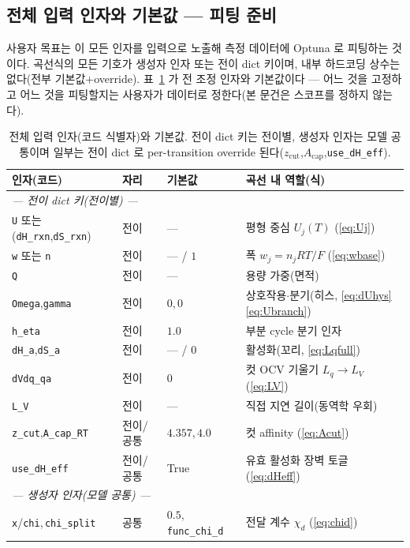 \documentclass[11pt,a4paper]{article}
\newcommand{\code}[1]{\texttt{#1}}
\begin{document}
\subsection{전체 입력 인자와 기본값 — 피팅 준비}
사용자 목표는 이 모든 인자를 입력으로 노출해 측정 데이터에 Optuna 로 피팅하는 것이다. 곡선식의 모든 기호가 생성자 인자
또는 전이 dict 키이며, 내부 하드코딩 상수는 없다(전부 기본값$+$override). 표~\ref{tab:inputs} 가 전 조정 인자와
기본값이다 — 어느 것을 고정하고 어느 것을 피팅할지는 사용자가 데이터로 정한다(본 문건은 스코프를 정하지 않는다).

\begin{table}[t]
\centering\footnotesize
\renewcommand{\arraystretch}{1.18}
\caption{전체 입력 인자(코드 식별자)와 기본값. 전이 dict 키는 전이별, 생성자 인자는 모델 공통이며 일부는 전이 dict 로
per-transition override 된다($z_\mathrm{cut}$,$A_\mathrm{cap}$,\code{use\_dH\_eff}).}
\label{tab:inputs}
\begin{tabular}{l l l l}
\toprule
인자(코드) & 자리 & 기본값 & 곡선 내 역할(식) \\
\midrule
\multicolumn{4}{l}{\emph{— 전이 dict 키(전이별) —}}\\
\code{U} 또는 (\code{dH\_rxn},\code{dS\_rxn}) & 전이 & --- & 평형 중심 $U_j(T)$ (\eqref{eq:Uj}) \\
\code{w} 또는 \code{n} & 전이 & --- / $1$ & 폭 $w_j=n_jRT/F$ (\eqref{eq:wbase}) \\
\code{Q} & 전이 & --- & 용량 가중(면적) \\
\code{Omega},\code{gamma} & 전이 & $0$,\,$0$ & 상호작용$\cdot$분기(히스, \eqref{eq:dUhys}\eqref{eq:Ubranch}) \\
\code{h\_eta} & 전이 & $1.0$ & 부분 cycle 분기 인자 \\
\code{dH\_a},\code{dS\_a} & 전이 & --- / $0$ & 활성화(꼬리, \eqref{eq:Lqfull}) \\
\code{dVdq\_qa} & 전이 & $0$ & 컷 OCV 기울기 $L_q\!\to\!L_V$ (\eqref{eq:LV}) \\
\code{L\_V} & 전이 & --- & 직접 지연 길이(동역학 우회) \\
\code{z\_cut},\code{A\_cap\_RT} & 전이/공통 & $4.357$,\,$4.0$ & 컷 affinity (\eqref{eq:Acut}) \\
\code{use\_dH\_eff} & 전이/공통 & True & 유효 활성화 장벽 토글(\eqref{eq:dHeff}) \\
\multicolumn{4}{l}{\emph{— 생성자 인자(모델 공통) —}}\\
\code{x}/\code{chi},\,\code{chi\_split} & 공통 & $0.5$,\,\code{func\_chi\_d} & 전달 계수 $\chi_d$ (\eqref{eq:chid}) \\

\end{tabular}
\end{table}
\end{document}
